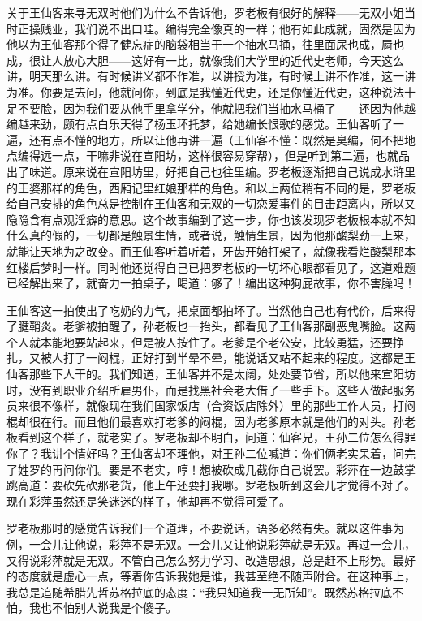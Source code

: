 关于王仙客来寻无双时他们为什么不告诉他，罗老板有很好的解释——无双小姐当时正操贱业，我们说不出口哇。编得完全像真的一样；他有如此成就，固然是因为他以为王仙客那个得了健忘症的脑袋相当于一个抽水马捅，往里面尿也成，屙也成，很让人放心大胆——这好有一比，就像我们大学里的近代史老师，今天这么讲，明天那么讲。有时候讲义都不作准，以讲授为准，有时候上讲不作准，这一讲为准。你要是去问，他就问你，到底是我懂近代史，还是你懂近代史，这种说法十足不要脸，因为我们要从他手里拿学分，他就把我们当抽水马桶了——还因为他越编越来劲，颇有点白乐天得了杨玉环托梦，给她编长恨歌的感觉。王仙客听了一遍，还有点不懂的地方，所以让他再讲一遍（王仙客不懂：既然是臭编，何不把地点编得远一点，干嘛非说在宣阳坊，这样很容易穿帮），但是听到第二遍，也就品出了味道。原来说在宣阳坊里，好把自己也往里编。罗老板逐渐把自己说成水浒里的王婆那样的角色，西厢记里红娘那样的角色。和以上两位稍有不同的是，罗老板给自己安排的角色总是控制在王仙客和无双的一切恋爱事件的目击距离内，所以又隐隐含有点观淫癖的意思。这个故事编到了这一步，你也该发现罗老板根本就不知什么真的假的，一切都是触景生情，或者说，触情生景，因为他那酸梨劲一上来，就能让天地为之改变。而王仙客听着听着，牙齿开始打架了，就像我看烂酸梨那本红楼后梦时一样。同时他还觉得自己已把罗老板的一切坏心眼都看见了，这道难题已经解出来了，就奋力一拍桌子，喝道：够了！编出这种狗屁故事，你不害臊吗！ 

王仙客这一拍使出了吃奶的力气，把桌面都拍坏了。当然他自己也有代价，后来得了腱鞘炎。老爹被拍醒了，孙老板也一抬头，都看见了王仙客那副恶鬼嘴脸。这两个人就本能地要站起来，但是被人按住了。老爹是个老公安，比较勇猛，还要挣扎，又被人打了一闷棍，正好打到半晕不晕，能说话又站不起来的程度。这都是王仙客那些下人干的。我们知道，王仙客并不是太阔，处处要节省，所以他来宣阳坊时，没有到职业介绍所雇男仆，而是找黑社会老大借了一些手下。这些人做起服务员来很不像样，就像现在我们国家饭店（合资饭店除外）里的那些工作人员，打闷棍却很在行。而且他们最喜欢打老爹的闷棍，因为老爹原本就是他们的对头。孙老板看到这个样子，就老实了。罗老板却不明白，问道：仙客兄，王孙二位怎么得罪你了？我讲个情好吗？王仙客却不理他，对王孙二位喊道：你们俩老实呆着，问完了姓罗的再问你们。要是不老实，哼！想被砍成几截你自己说罢。彩萍在一边鼓掌跳高道：要砍先砍那老货，他上午还要打我哪。罗老板听到这会儿才觉得不对了。现在彩萍虽然还是笑迷迷的样子，他却再不觉得可爱了。 

罗老板那时的感觉告诉我们一个道理，不要说话，语多必然有失。就以这件事为例，一会儿让他说，彩萍不是无双。一会儿又让他说彩萍就是无双。再过一会儿，又得说彩萍就是无双。不管自己怎么努力学习、改造思想，总是赶不上形势。最好的态度就是虚心一点，等着你告诉我她是谁，我甚至绝不随声附合。在这种事上，我总是追随希腊先哲苏格拉底的态度：“我只知道我一无所知”。既然苏格拉底不怕，我也不怕别人说我是个傻子。 

